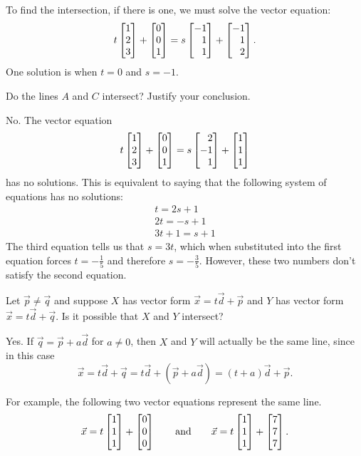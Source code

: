 \documentclass{workbook}
\begin{document}
\begin{slide}
\begin{parts}
\begin{solution}
				To find the intersection, if there is one, we must solve the vector equation:
				\[
					t\mat{1\\2\\3}+\mat{0\\0\\1} = s\mat{-1\\1\\1}+\mat{-1\\1\\2}.
				\]
				One solution is when $t = 0$ and $s = -1$.
			\end{solution}
		\item Do the lines $A$ and $C$ intersect? Justify your conclusion.
			\begin{solution}
				No. The vector equation
				\[
					t\mat{1\\2\\3}+\mat{0\\0\\1} = s\mat{2\\-1\\1}+\mat{1\\1\\1}
				\]
				has no solutions. This is equivalent to saying that the following
				system of equations has no solutions:
				\begin{gather*}
					t = 2s + 1 \\
					2t = -s + 1 \\
					3t + 1 = s + 1
				\end{gather*}
				The third equation tells us that $s = 3t$, which when substituted
				into the first equation forces $t = -\tfrac{1}{5}$ and therefore
				$s = -\tfrac{3}{5}$. However, these two numbers don't satisfy the second
				equation.
			\end{solution}
		\item Let $\vec p\neq \vec q$ and suppose
			$X$ has vector form $\vec x=t\vec d+\vec p$ and $Y$ has
			vector form $\vec x=t\vec d+\vec q$. Is it possible
			that $X$ and $Y$ intersect?
			\begin{solution}
				Yes. If $\vec q=\vec p+a\vec d$ for $a\neq 0$, then $X$ and $Y$
				will actually be the same line, since in this case
				\[
					\vec x = t\vec d+\vec q
					= t\vec d+(\vec p+a\vec d)
					= (t+a)\vec d+\vec p.
				\]

				For example, the following two vector equations represent the
				same line.
				\[
					\vec x = t \mat{1\\1\\1} + \mat{0\\0\\0}
					\qquad \text{and} \qquad
					\vec x = t \mat{1\\1\\1} + \mat{7\\7\\7}.
				\]
			\end{solution}
	\end{parts}
\end{slide}
\end{document}
